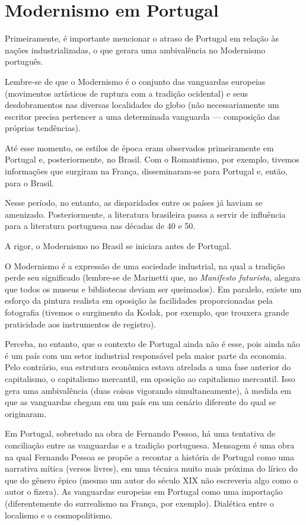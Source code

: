 
\chapter{Modernismo em Portugal}

Primeiramente, é importante mencionar o atraso de Portugal em relação às nações industrializadas, o que gerara uma ambivalência no Modernismo português.

Lembre-se de que o Modernismo é o conjunto das vanguardas europeias (movimentos artísticos de ruptura com a tradição ocidental) e seus desdobramentos nas diversas localidades do globo (não necessariamente um escritor precisa pertencer a uma determinada vanguarda — composição das próprias tendências).

Até esse momento, os estilos de época eram observados primeiramente em Portugal e, posteriormente, no Brasil. Com o Romantismo, por exemplo, tivemos informações que surgiram na França, disseminaram-se para Portugal e, então, para o Brasil.

Nesse período, no entanto, as disparidades entre os países já haviam se amenizado. Posteriormente, a literatura brasileira passa a servir de influência para a literatura portuguesa nas décadas de 40 e 50.

A rigor, o Modernismo no Brasil se iniciara antes de Portugal.

O Modernismo é a expressão de uma sociedade industrial, na qual a tradição perde seu significado (lembre-se de Marinetti que, no \textit{Manifesto futurista}, alegara que todos os museus e bibliotecas deviam ser queimados). Em paralelo, existe um esforço da pintura realista em oposição às facilidades proporcionadas pela fotografia (tivemos o surgimento da Kodak, por exemplo, que trouxera grande praticidade aos instrumentos de registro).

Perceba, no entanto, que o contexto de Portugal ainda não é esse, pois ainda não é um país com um setor industrial responsável pela maior parte da economia. Pelo contrário, sua estrutura econômica estava atrelada a uma fase anterior do capitalismo, o capitalismo mercantil, em oposição ao capitalismo mercantil. Isso gera uma ambivalência (duas coisas vigorando simultaneamente), à medida em que as vanguardas chegam em um país em um cenário diferente do qual se originaram. 

Em Portugal, sobretudo na obra de Fernando Pessoa, há uma tentativa de conciliação entre as vanguardas e a tradição portuguesa. Mensagem é uma obra na qual Fernando Pessoa se propõe a recontar a história de Portugal como uma narrativa mítica (versos livres), em uma técnica muito mais próxima do lírico do que do gênero épico (mesmo um autor do século XIX não escreveria algo como o autor o fizera). As vanguardas europeias em Portugal como uma importação (diferentemente do surrealismo na França, por exemplo). Dialética entre o localismo e o cosmopolitismo.

